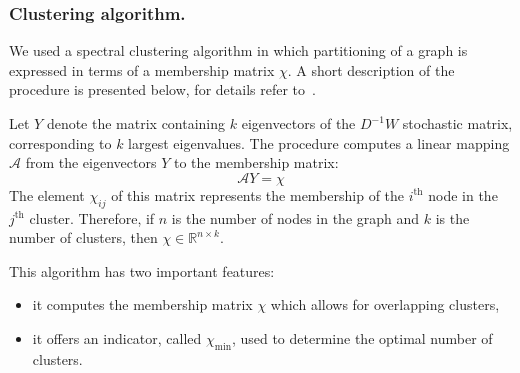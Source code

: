\documentclass[a4paper,11pt,twoside]{book}%
\begin{document}
\subsubsection*{Clustering algorithm.}
We used a spectral clustering algorithm in which partitioning of a graph is expressed in terms of a membership matrix $\chi$.
A short description of the procedure is presented below, for details refer to~\cite{weber2004perron}.

Let $Y$ denote the matrix containing $k$ eigenvectors of the $D^{-1}W$ stochastic matrix, corresponding to $k$ largest eigenvalues.
The procedure computes a linear mapping $\mathcal{A}$ from the eigenvectors $Y$ to the membership matrix:
\begin{displaymath}
\mathcal{A} Y = \chi
\end{displaymath}
The element $\chi_{ij}$ of this matrix represents the membership of the $i^{\textrm{th}}$ node in the $j^{\textrm{th}}$ cluster.
Therefore, if $n$ is the number of nodes in the graph and $k$ is the number of clusters, then $\chi\in\mathbb{R}^{n\times k}$.

This algorithm has two important features:
\begin{itemize}
\item it computes the membership matrix $\chi$ which allows for overlapping clusters,
\item it offers an indicator, called $\chi_{\text{min}}$, used to determine the optimal number of clusters.
\end{itemize}
\end{document}
